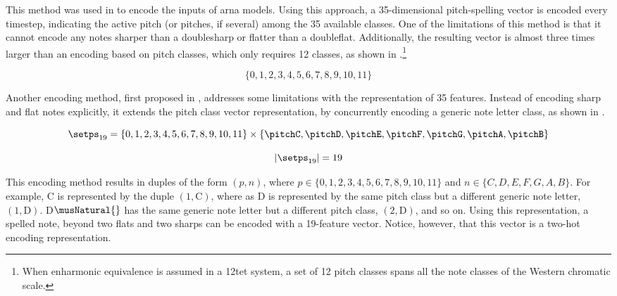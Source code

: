 This method was used in \textcite{micchi2020not,
micchi2021deep} to encode the inputs of \gls{arna} models.
Using this approach, a 35-dimensional pitch-spelling vector
is encoded every timestep, indicating the active pitch (or
pitches, if several) among the 35 available classes. One of
the limitations of this method is that it cannot encode any
notes sharper than a \gls{doublesharp} or flatter than a
\gls{doubleflat}. Additionally, the resulting vector is
almost three times larger than an encoding based on pitch
classes, which only requires 12 classes, as shown in
.\footnote{When enharmonic equivalence
is assumed in a \gls{12tet} system, a set of 12 pitch
classes spans all the note classes of the Western chromatic
scale.}

\begin{equation}
    \label{eq:pitch_classes}
    \{0, 1, 2, 3, 4, 5, 6, 7, 8, 9, 10, 11\}
\end{equation}



Another encoding method, first proposed in
\textcite{napoleslopez2021augmentednet}, addresses some
limitations with the representation of 35 features. Instead
of encoding \gls{sharp} and \gls{flat} notes explicitly, it
extends the pitch class vector representation, by
concurrently encoding a generic note letter class, as shown
in .

\begin{equation}
    \label{eq:pitch_spelling_19}
    \setps_{19} = \{0, 1, 2, 3, 4, 5, 6, 7, 8, 9, 10, 11\} 
    \times \{ \pitchC, \pitchD, \pitchE, \pitchF, \pitchG, \pitchA, \pitchB \}
\end{equation}


\begin{equation}
    \label{eq:pitch_spelling_19_magnitude}
    | \setps_{19} | = 19
\end{equation}

This encoding method results in duples of the form $(p, n)$,
where $p \in \{0, 1, 2, 3, 4, 5, 6, 7, 8, 9, 10, 11\}$ and
$n \in \{C, D, E, F, G, A, B\}$. For example, C\musSharp{}
is represented by the duple $(1, \text{C})$, where as
D\musFlat{} is represented by the same pitch class but a
different generic note letter, $(1, \text{D})$.
D$\musNatural{}$ has the same generic note letter but a
different pitch class, $(2, \text{D})$, and so on. Using
this representation, a spelled note, beyond two flats and
two sharps can be encoded with a 19-feature vector. Notice,
however, that this vector is a two-hot encoding
representation.
